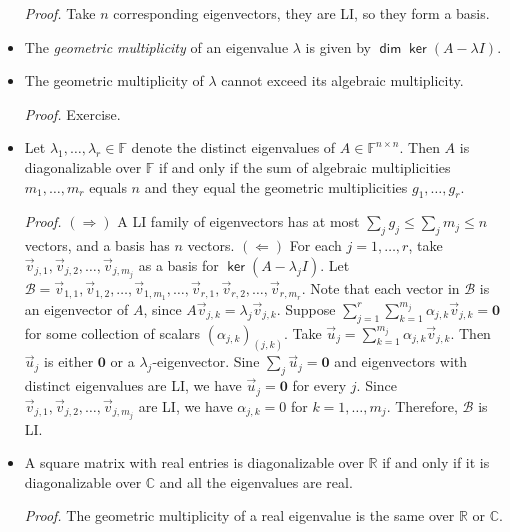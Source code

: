 \documentclass[11pt]{article}
\newcommand{\1}{\mathbf{1}}
\newcommand{\0}{\mathbf{0}}
\newcommand{\B}{\mathcal{B}}
\newcommand{\C}{\mathbb{C}}
\newcommand{\F}{\mathbb{F}}
\newcommand{\R}{\mathbb{R}}
\DeclareMathOperator{\myker}{\mathsf{ker}}
\DeclareMathOperator{\mydim}{\mathsf{dim}}
\newcommand{\vu}{\vec{u}}
\newcommand{\vv}{\vec{v}}
\newcommand{\spitem}{\item[$\circ$]}
\begin{document}
\begin{itemize}
\emph{Proof.}
Take $n$ corresponding eigenvectors, they are LI, so they form a basis.

\item

The \emph{geometric multiplicity} of an eigenvalue $\lambda$ is given by $\mydim \myker (A-\lambda I)$.

\item

The geometric multiplicity of $\lambda$ cannot exceed its algebraic multiplicity.

\emph{Proof.}
Exercise.

\spitem

Let $\lambda_1,\dots,\lambda_r \in \F$ denote the distinct eigenvalues of $A \in \F^{n \times n}$.
Then $A$ is diagonalizable over $\F$ if and only if the sum of algebraic multiplicities $m_1,\dots,m_r$ equals $n$ and they equal the geometric multiplicities $g_1,\dots,g_r$.


\emph{Proof.}
$(\Rightarrow)$
A LI family of eigenvectors has at most $\sum_j g_j \leqslant \sum_j m_j \leqslant n$ vectors, and a basis has $n$ vectors.
$(\Leftarrow)$
For each $j=1,\dots,r$, take $\vv_{j,1},\vv_{j,2},\dots,\vv_{j,m_j}$ as a basis for $\myker (A - \lambda_j I)$.
Let $\B = \vv_{1,1},\vv_{1,2},\dots,\vv_{1,m_1},\dots,\vv_{r,1},\vv_{r,2},\dots,\vv_{r,m_r}$.
Note that each vector in $\B$ is an eigenvector of $A$, since $A \vv_{j,k} = \lambda_j \vv_{j,k}$.
Suppose $\sum_{j=1}^r \sum_{k=1}^{m_j} \alpha_{j,k} \vv_{j,k} = \0$ for some collection of scalars $(\alpha_{j,k})_{(j,k)}$.
Take $\vu_j = \sum_{k=1}^{m_j} \alpha_{j,k} \vv_{j,k}$.
Then $\vu_j$ is either $\0$ or a $\lambda_j$-eigenvector.
Sine $\sum_j \vu_j = \0$ and eigenvectors with distinct eigenvalues are LI, we have $\vu_j = \0$ for every $j$.
Since $\vv_{j,1},\vv_{j,2},\dots,\vv_{j,m_j}$ are LI, we have $\alpha_{j,k}=0$ for $k=1,\dots,m_j$.
Therefore, $\B$ is LI.

\spitem

A square matrix with real entries is diagonalizable over $\R$ if and only if it is diagonalizable over $\C$ and all the eigenvalues are real.

\emph{Proof.}
The geometric multiplicity of a real eigenvalue is the same over $\R$ or $\C$.


\end{itemize}
\end{document}
